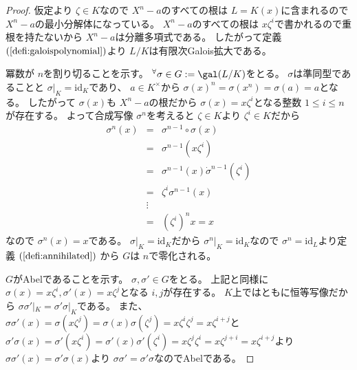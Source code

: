 \documentclass[../master_galois_theory]{subfiles}
\begin{document}
\begin{proof}
  仮定より $\zeta \in K$なので $X^n - a$のすべての根は $L = K(x)$に含まれるので
  $X^n - a$の最小分解体になっている。
  $X^n - a$のすべての根は $x \zeta^i$で書かれるので重根を持たないから
  $X^n - a$は分離多項式である。
  したがって定義 $(\mathrm{\ref{defi:galoispolynomial}})$より
  $L/K$は有限次\rm{Galois}拡大である。

  冪数が $n$を割り切ることを示す。
  ${}^\forall \sigma \in G := \gal(L/K)$をとる。
  $\sigma$は準同型であることと $\sigma|_K = \mathrm{id}_K$であり、
  $a \in K^\times$から
  $\sigma(x)^n = \sigma(x^n) = \sigma(a) = a$となる。
  したがって $\sigma(x)$も $X^n - a$の根だから
  $\sigma(x) = x \zeta^i$となる整数 $1 \leq i \leq n$が存在する。
  よって合成写像 $\sigma^n$を考えると $\zeta \in K$より $\zeta^i \in K$だから
  \begin{eqnarray*}
    \sigma^n(x) & = & \sigma^{n-1} \circ \sigma(x) \\
    & = & \sigma^{n-1}(x \zeta^i) \\
    & = & \sigma^{n-1}(x) \dot \sigma^{n-1}(\zeta^i) \\
    & = & \zeta^i \sigma^{n-1}(x) \\
    & \vdots & \\
    & = & (\zeta^i)^n x = x
  \end{eqnarray*}
  なので $\sigma^n(x) = x$である。
  $\sigma|_K = \mathrm{id}_K$だから $\sigma^n|_K = \mathrm{id}_K$なので
  $\sigma^n = \mathrm{id}_L$より定義 $(\mathrm{\ref{defi:annihilated}})$
  から $G$は $n$で零化される。

  $G$が\rm{Abel}であることを示す。
  $\sigma , \sigma' \in G$をとる。
  上記と同様に $\sigma(x) = x \zeta^i , \sigma'(x) = x \zeta^j$となる
  $i , j$が存在する。
  $K$上ではともに恒等写像だから $\sigma \sigma'|_K = \sigma' \sigma|_K$である。
  また、 $\sigma \sigma'(x) = \sigma(x \zeta^j) = \sigma(x) \sigma(\zeta^j) = x \zeta^i \zeta^j = x \zeta^{i + j}$と
  $\sigma' \sigma(x) = \sigma'(x \zeta^i) = \sigma'(x) \sigma'(\zeta^i) = x \zeta^j \zeta^i = x \zeta^{j + i} = x \zeta^{i + j}$より
  $\sigma \sigma'(x) = \sigma' \sigma(x)$より
  $\sigma \sigma' = \sigma' \sigma$なので\rm{Abel}である。
\end{proof}
\end{document}
